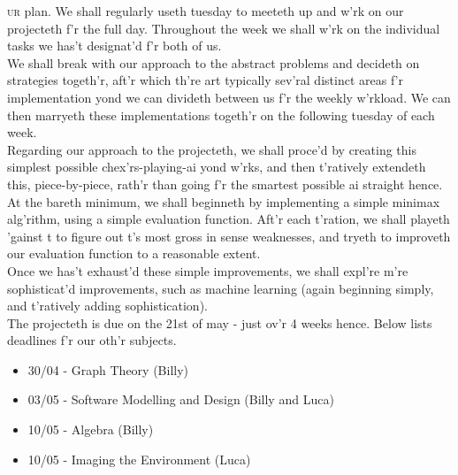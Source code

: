 \documentclass{article}[11pt]
\begin{document}
{\frakfamily\fraklines \lettrine[lines=2]{}{ur} plan.
We shall regularly useth tuesday to meeteth up and w'rk on our projecteth f'r the full day.  Throughout the week we shall w'rk on the individual tasks we has't designat'd f'r both of us. \\
 
We shall break with our approach to the abstract problems and decideth on strategies togeth'r, aft'r which th're art typically sev'ral distinct areas f'r implementation yond we can divideth between us f'r the weekly w'rkload.  We can then marryeth these implementations togeth'r on the following tuesday of each week. \\
 
Regarding our approach to the projecteth, we shall proce'd by creating this simplest possible chex'rs-playing-ai yond w'rks, and then t'ratively extendeth this, piece-by-piece, rath'r than going f'r the smartest possible ai straight hence. \\
 
At the bareth minimum, we shall beginneth by implementing a simple minimax alg'rithm, using a simple evaluation function.  Aft'r each t'ration, we shall playeth 'gainst t to figure out t's most gross in sense weaknesses, and tryeth to improveth our evaluation function to a reasonable extent. \\
 
Once we has't exhaust'd these simple improvements, we shall expl're m're sophisticat'd improvements, such as machine learning (again beginning simply, and t'ratively adding sophistication). \\
 
The projecteth is due on the 21st of may - just ov'r 4 weeks hence.  Below lists deadlines f'r our oth'r subjects.
\begin{itemize}
    \item 30/04 - Graph Theory (Billy)
    \item 03/05 - Software Modelling and Design (Billy and Luca)
    \item 10/05 - Algebra (Billy)
    \item 10/05 - Imaging the Environment (Luca)
\end{itemize}



}
\end{document}
